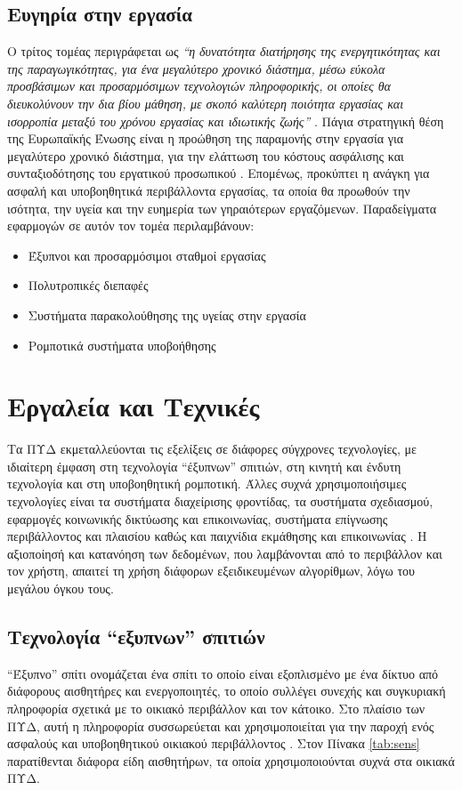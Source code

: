 \subsection{Ευγηρία στην εργασία}
Ο τρίτος τομέας περιγράφεται ως \textit{``η δυνατότητα διατήρησης της ενεργητικότητας και της παραγωγικότητας, για ένα μεγαλύτερο χρονικό διάστημα, μέσω εύκολα προσβάσιμων και προσαρμόσιμων τεχνολογιών πληροφορικής, οι οποίες θα διευκολύνουν την δια βίου μάθηση, με σκοπό καλύτερη ποιότητα εργασίας και ισορροπία μεταξύ του χρόνου εργασίας και ιδιωτικής ζωής''} \cite{broek}.
Πάγια στρατηγική θέση της Ευρωπαϊκής Ένωσης είναι η προώθηση της παραμονής στην εργασία για μεγαλύτερο χρονικό διάστημα, για την ελάττωση του κόστους ασφάλισης και συνταξιοδότησης του εργατικού προσωπικού \cite{morschhauser2006healthy}\cite{dubois2019extending}.
Επομένως, προκύπτει η ανάγκη για ασφαλή και υποβοηθητικά περιβάλλοντα εργασίας, τα οποία θα προωθούν την ισότητα, την υγεία και την ευημερία των γηραιότερων εργαζόμενων.
Παραδείγματα εφαρμογών σε αυτόν τον τομέα περιλαμβάνουν:
\begin{itemize}
    \item Έξυπνοι και προσαρμόσιμοι σταθμοί εργασίας
    \item Πολυτροπικές διεπαφές
    \item Συστήματα παρακολούθησης της υγείας στην εργασία
    \item Ρομποτικά συστήματα υποβοήθησης
\end{itemize}{}
\section{Εργαλεία και Τεχνικές}
Τα ΠΥΔ εκμεταλλεύονται τις εξελίξεις σε διάφορες σύγχρονες τεχνολογίες, με ιδιαίτερη έμφαση στη τεχνολογία ``έξυπνων'' σπιτιών, στη κινητή και ένδυτη τεχνολογία και στη υποβοηθητική ρομποτική. Άλλες συχνά χρησιμοποιήσιμες τεχνολογίες είναι τα συστήματα διαχείρισης φροντίδας, τα συστήματα σχεδιασμού, εφαρμογές κοινωνικής δικτύωσης και επικοινωνίας, συστήματα επίγνωσης περιβάλλοντος και πλαισίου καθώς και παιχνίδια εκμάθησης και επικοινωνίας \cite{rashidi2012survey}.
Η αξιοποίησή και κατανόηση των δεδομένων, που λαμβάνονται από το περιβάλλον και τον χρήστη, απαιτεί τη χρήση διάφορων εξειδικευμένων αλγορίθμων, λόγω του μεγάλου όγκου τους.
\subsection{Τεχνολογία ``εξυπνων'' σπιτιών}
``Έξυπνο'' σπίτι ονομάζεται ένα σπίτι το οποίο είναι εξοπλισμένο με ένα δίκτυο από διάφορους αισθητήρες και ενεργοποιητές, το οποίο συλλέγει συνεχής και συγκυριακή πληροφορία σχετικά με το οικιακό περιβάλλον και τον κάτοικο.
Στο πλαίσιο των ΠΥΔ, αυτή η πληροφορία συσσωρεύεται και χρησιμοποιείται για την παροχή ενός ασφαλούς και υποβοηθητικού οικιακού περιβάλλοντος \cite{rashidi2012survey}\cite{Liu2016}\cite{Demiris2008}.
Στον Πίνακα \ref{tab:sens} παρατίθενται διάφορα είδη αισθητήρων, τα οποία χρησιμοποιούνται συχνά στα οικιακά ΠΥΔ.

